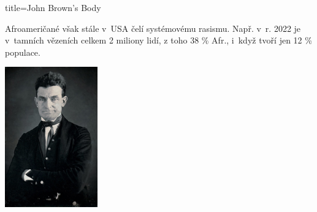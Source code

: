 \begin{song}{title=\predtitle \centering John Brown's Body \\\large  }
{\begin{centerjustified}
\begin{varwidth}[t]{0.55\textwidth}
\begin{varwidth}{.5\textwidth}
Afroameričané však stále v~USA čelí systémovému rasismu.
Např. v~r. 2022 je v~tamních vězeních celkem 2 miliony lidí, z toho 38 \% Afr.,
i~když tvoří jen 12 \% populace.
\end{varwidth}
\begin{varwidth}{.2\textwidth}
\includegraphics[width=4cm]{../img/JohnBrown.jpg}
\end{varwidth}



\end{varwidth}
\end{centerjustified}


}




\setcounter{Slokočet}{0}
\end{song}

